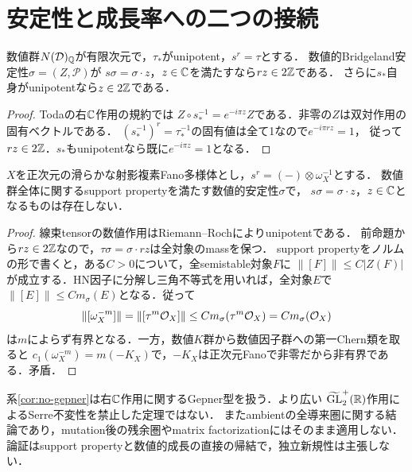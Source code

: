 \section{安定性と成長率への二つの接続}
\label{sec:dynamics}
\begin{proposition}[Gepner位相の必要条件]\label{prop:gepner}
数値群$N(\mathcal D)_\mathbb Q$が有限次元で，$\tau_*$がunipotent，$s^r=\tau$とする．
数値的Bridgeland安定性$\sigma=(Z,\mathcal P)$が
$s\sigma=\sigma\cdot z$，$z\in\mathbb C$を満たすなら$rz\in2\mathbb Z$である．
さらに$s_*$自身がunipotentなら$z\in2\mathbb Z$である．
\end{proposition}
\begin{proof}
Toda\cite[Definition 2.3]{TodaGepner}の右$\mathbb C$作用の規約では
$Z\circ s_*^{-1}=e^{-i\pi z}Z$である．非零の$Z$は双対作用の固有ベクトルである．
$(s_*^{-1})^r=\tau_*^{-1}$の固有値は全て1なので$e^{-i\pi rz}=1$，
従って$rz\in2\mathbb Z$．$s_*$もunipotentなら既に$e^{-i\pi z}=1$となる．
\end{proof}

\begin{corollary}[Fano全圏におけるGepner型の非存在]\label{cor:no-gepner}
$X$を正次元の滑らかな射影複素Fano多様体とし，$s^r=(-)\otimes\omega_X^{-1}$とする．
数値群全体に関するsupport propertyを満たす数値的安定性$\sigma$で，
$s\sigma=\sigma\cdot z$，$z\in\mathbb C$となるものは存在しない．
\end{corollary}
\begin{proof}
線束tensorの数値作用はRiemann--Rochによりunipotentである．
前命題から$rz\in2\mathbb Z$なので，$\tau\sigma=\sigma\cdot rz$は全対象のmassを保つ．
support propertyをノルムの形で書くと，ある$C>0$について，全semistable対象$F$に
$\|[F]\|\le C|Z(F)|$が成立する．HN因子に分解し三角不等式を用いれば，全対象$E$で
$\|[E]\|\le C m_\sigma(E)$となる．従って
\[
 \|[\omega_X^{-m}]\|=\|[\tau^m\mathcal O_X]\|
 \le C m_\sigma(\tau^m\mathcal O_X)=C m_\sigma(\mathcal O_X)
\]
は$m$によらず有界となる．一方，数値$K$群から数値因子群への第一Chern類を取ると
$c_1(\omega_X^{-m})=m(-K_X)$で，$-K_X$は正次元Fanoで非零だから非有界である．矛盾．
\end{proof}

\begin{remark}
系\ref{cor:no-gepner}は右$\mathbb C$作用に関するGepner型を扱う．より広い
$\widetilde{\mathrm{GL}}_2^+(\mathbb R)$作用によるSerre不変性を禁止した定理ではない．
またambientの全導来圏に関する結論であり，mutation後の残余圏やmatrix factorizationにはそのまま適用しない．
論証はsupport propertyと数値的成長の直接の帰結で，独立新規性は主張しない．
\end{remark}

